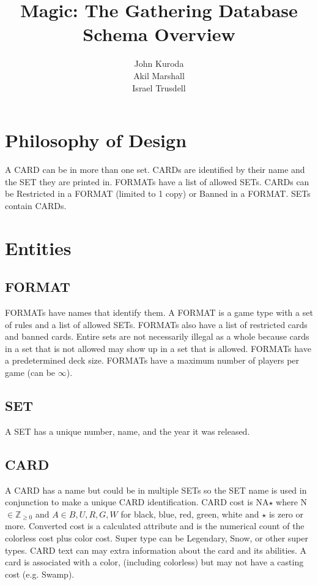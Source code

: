 \documentclass{article}
\title{Magic: The Gathering Database Schema Overview}
\author{John Kuroda\\Akil Marshall\\Israel Trusdell}
\begin{document}
\maketitle
\tableofcontents
\newpage
\section{Philosophy of Design}
A CARD can be in more than one set.
CARDs are identified by their name and the SET they are printed in.
FORMATs have a list of allowed SETs.
CARDs can be Restricted in a FORMAT (limited to 1 copy) or Banned in a FORMAT.
SETs contain CARDs.

\section{Entities}
\subsection{FORMAT}
FORMATs have names that identify them.
A FORMAT is a game type with a set of rules and a list of allowed SETs.
FORMATs also have a list of restricted cards and banned cards.  Entire sets are not necessarily illegal as a whole because cards in a set that is not allowed may show up in a set that is allowed.
FORMATs have a predetermined deck size.
FORMATs have a maximum number of players per game (can be $\infty$).
\subsection{SET}
A SET has a unique number, name, and the year it was released.
\subsection{CARD}
A CARD has a name but could be in multiple SETs so the SET name is used in conjunction to make a unique CARD identification.
CARD cost is NA$\star$ where N $\in \mathbb{Z}_{\geq 0}$ and $A \in {B, U, R, G, W}$ for black, blue, red, green, white and $\star$ is zero or more.
Converted cost is a calculated attribute and is the numerical count of the colorless cost plus color cost.
Super type can be Legendary, Snow, or other super types.
CARD text can may extra information about the card and its abilities.
A card is associated with a color, (including colorless) but may not have a casting cost (e.g. Swamp).
\end{document}

